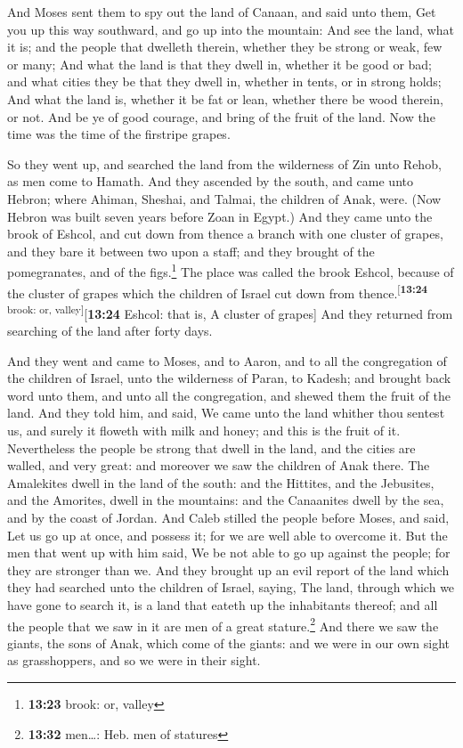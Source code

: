  And Moses sent them to spy out the land of Canaan, and
said unto them, Get you up this way southward, and go up into the
mountain:  And see the land, what it is; and the people
that dwelleth therein, whether they be strong or weak, few or many;
 And what the land is that they dwell in, whether it be
good or bad; and what cities they be that they dwell in, whether in
tents, or in strong holds;  And what the land is, whether
it be fat or lean, whether there be wood therein, or not. And be ye of
good courage, and bring of the fruit of the land. Now the time was the
time of the firstripe grapes.

 So they went up, and searched the land from the
wilderness of Zin unto Rehob, as men come to Hamath.  And
they ascended by the south, and came unto Hebron; where Ahiman, Sheshai,
and Talmai, the children of Anak, were. (Now Hebron was built seven
years before Zoan in Egypt.)  And they came unto the
brook of Eshcol, and cut down from thence a branch with one cluster of
grapes, and they bare it between two upon a staff; and they brought of
the pomegranates, and of the figs.\footnote{\textbf{13:23} brook: or,
  valley}  The place was called the brook Eshcol, because
of the cluster of grapes which the children of Israel cut down from
thence.\textsuperscript{{[}\textbf{13:24} brook: or,
valley{]}}{[}\textbf{13:24} Eshcol: that is, A cluster of grapes{]}
 And they returned from searching of the land after forty
days.

 And they went and came to Moses, and to Aaron, and to
all the congregation of the children of Israel, unto the wilderness of
Paran, to Kadesh; and brought back word unto them, and unto all the
congregation, and shewed them the fruit of the land.  And
they told him, and said, We came unto the land whither thou sentest us,
and surely it floweth with milk and honey; and this is the fruit of it.
 Nevertheless the people be strong that dwell in the
land, and the cities are walled, and very great: and moreover we saw the
children of Anak there.  The Amalekites dwell in the land
of the south: and the Hittites, and the Jebusites, and the Amorites,
dwell in the mountains: and the Canaanites dwell by the sea, and by the
coast of Jordan.  And Caleb stilled the people before
Moses, and said, Let us go up at once, and possess it; for we are well
able to overcome it.  But the men that went up with him
said, We be not able to go up against the people; for they are stronger
than we.  And they brought up an evil report of the land
which they had searched unto the children of Israel, saying, The land,
through which we have gone to search it, is a land that eateth up the
inhabitants thereof; and all the people that we saw in it are men of a
great stature.\footnote{\textbf{13:32} men\ldots: Heb. men of statures}
 And there we saw the giants, the sons of Anak, which
come of the giants: and we were in our own sight as grasshoppers, and so
we were in their sight.

